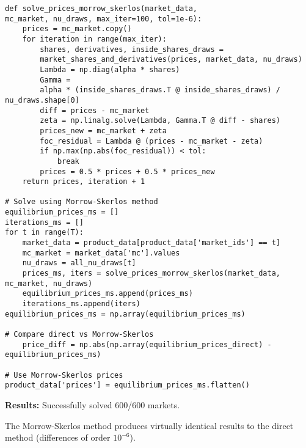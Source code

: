 \documentclass[english,11pt]{article}
\begin{document}
\begin{enumerate}
\begin{enumerate}
\begin{verbatim}
def solve_prices_morrow_skerlos(market_data,
mc_market, nu_draws, max_iter=100, tol=1e-6):
    prices = mc_market.copy()
    for iteration in range(max_iter):
        shares, derivatives, inside_shares_draws = 
        market_shares_and_derivatives(prices, market_data, nu_draws)
        Lambda = np.diag(alpha * shares)
        Gamma = 
        alpha * (inside_shares_draws.T @ inside_shares_draws) / nu_draws.shape[0]
        diff = prices - mc_market
        zeta = np.linalg.solve(Lambda, Gamma.T @ diff - shares)
        prices_new = mc_market + zeta
        foc_residual = Lambda @ (prices - mc_market - zeta)
        if np.max(np.abs(foc_residual)) < tol:
            break
        prices = 0.5 * prices + 0.5 * prices_new
    return prices, iteration + 1
    
# Solve using Morrow-Skerlos method
equilibrium_prices_ms = []
iterations_ms = []
for t in range(T):
    market_data = product_data[product_data['market_ids'] == t]
    mc_market = market_data['mc'].values
    nu_draws = all_nu_draws[t]
    prices_ms, iters = solve_prices_morrow_skerlos(market_data, mc_market, nu_draws)
    equilibrium_prices_ms.append(prices_ms)
    iterations_ms.append(iters)
equilibrium_prices_ms = np.array(equilibrium_prices_ms)

# Compare direct vs Morrow-Skerlos 
    price_diff = np.abs(np.array(equilibrium_prices_direct) - equilibrium_prices_ms)
    
# Use Morrow-Skerlos prices
product_data['prices'] = equilibrium_prices_ms.flatten()
\end{verbatim}


\textbf{Results:} Successfully solved 600/600 markets. 

The Morrow-Skerlos method produces virtually identical results to the direct method (differences of order $10^{-6}$).



\end{enumerate}
\end{enumerate}
\end{document}
